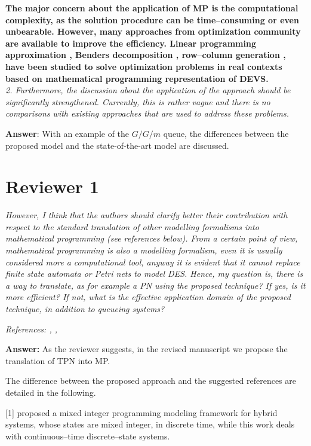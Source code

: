 \documentclass[suppldata]{interact}
\begin{document}
\textbf{The major concern about the application of MP is the computational complexity, %
as the solution procedure can be time--consuming or even unbearable. However, many approaches from optimization community are available to improve the efficiency. Linear programming approximation \citep{alfieri2012mathematical}, Benders decomposition \citep{weiss2015buffer}, row--column generation \citep{alfieri2020time}, have been studied to solve optimization problems in %
real contexts based on mathematical programming representation of DEVS.}
~\\

\textit{2. Furthermore, the discussion about the application of the approach should be significantly strengthened. Currently, this is rather vague and there is no comparisons with existing approaches that are used to address these problems.}

\noindent
\textbf{Answer}: With an example of the $G/G/m$ queue, the differences between the proposed model and the state-of-the-art model are discussed.


\section{Reviewer 1}
\textit{However, I think that the authors should clarify better their contribution with respect to the standard translation of other modelling formalisms into mathematical programming (see references below). From a certain point of view, mathematical programming is also a modelling formalism, even it is usually considered more a computational tool, anyway it is evident that it cannot replace finite state automata or Petri nets to model DES. Hence, my question is, there is a way to translate, as for example a PN using the proposed technique? If yes, is it more efficient? If not, what is the effective application domain of the proposed technique, in addition to queueing systems?}


\textit{References: \cite{basile2012k}, \cite{basile2012k}, \cite{bemporad1999control}}

\noindent
\textbf{Answer:} As the reviewer suggests, %
in the revised manuscript we propose the translation of TPN into MP. 


The difference between the proposed approach and the suggested references are %
detailed in the following. 

[1] \cite{bemporad1999control} proposed a mixed integer programming modeling framework for hybrid systems, whose states are mixed integer, in discrete time, while this work deals with continuous--time discrete--state systems. 
\end{document}
